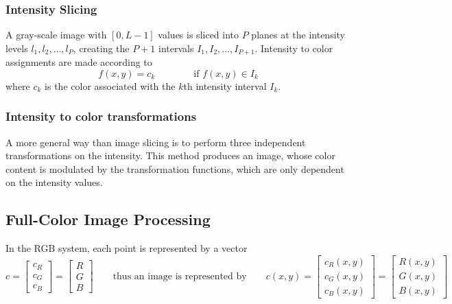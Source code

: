 \subsubsection{Intensity Slicing }
A gray-scale image with $[0,L-1]$ values is sliced into $P$ planes at the intensity levels $l_1,l_2,\dots,l_P$, creating the $P+1$ intervals $I_1,I_2,\dots,I_{P+1}$. Intensity to color assignments are made according to
\begin{equation}
	f(x,y) = c_k \qquad \qquad \text{if } f(x,y) \in I_k
\end{equation}
where $c_k$ is the color associated with the $k$th intensity interval $I_k$.

\subsubsection{Intensity to color transformations }
\begin{minipage}{12cm}
	A more general way than image slicing is to perform three independent transformations on the intensity. This method produces an image, whose color content is modulated by the transformation functions, which are only dependent on the intensity values.
\end{minipage}
\begin{minipage}{6cm}
\end{minipage}

\subsection{Full-Color Image Processing }
In the RGB system, each point is represented by a vector
\begin{equation}
	c = \left[\begin{array}{l}
		c_R \\ c_G \\ c_B
	\end{array} \right]
	= \left[\begin{array}{l}
		R \\ G \\ B
	\end{array} \right]
	\qquad \text{thus an image is represented by} \qquad
	c(x,y) = \left[\begin{array}{l}
		c_R(x,y) \\ c_G(x,y) \\ c_B(x,y)
	\end{array} \right]
	= \left[\begin{array}{l}
		R(x,y) \\ G(x,y) \\ B(x,y)
	\end{array} \right]
\end{equation}

